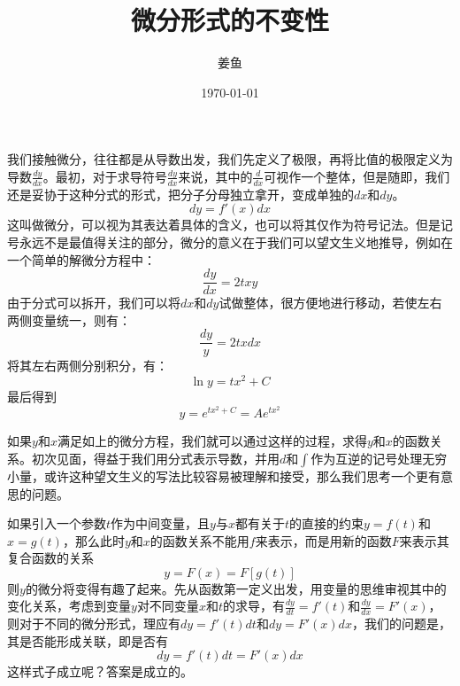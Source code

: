 \documentclass[fontset=none]{ctexart}
\begin{document}
\title{微分形式的不变性}
\author{姜鱼}
\date{\today}
\maketitle

\songti 我们接触微分，往往都是从导数出发，我们先定义了极限，再将比值的极限定义为导数$\frac{dy}{dx}$。最初，对于求导符号$\frac{dy}{dx}$来说，其中的$\frac{d}{dx}$可视作一个整体，但是随即，我们还是妥协于这种分式的形式，把分子分母独立拿开，变成单独的$dx$和$dy$。        
\begin{equation}
    dy=f'\left( x \right) dx
\end{equation}
这叫做微分，可以视为其表达着具体的含义，也可以将其仅作为符号记法。但是记号永远不是最值得关注的部分，微分的意义在于我们可以望文生义地推导，例如在一个简单的解微分方程中：
\begin{equation}
    \frac{dy}{dx}=2txy
\end{equation}
由于分式可以拆开，我们可以将$dx$和$dy$试做整体，很方便地进行移动，若使左右两侧变量统一，则有：
\begin{equation}
    \frac{dy}{y}=2txdx
\end{equation}
将其左右两侧分别积分，有：
\begin{equation}
    \ln y=tx^2+C
\end{equation}
最后得到
\begin{equation}
    y=e^{tx^2+C}=Ae^{tx^2}
\end{equation}

如果$y$和$x$满足如上的微分方程，我们就可以通过这样的过程，求得$y$和$x$的函数关系。初次见面，得益于我们用分式表示导数，并用$d$和$\int$作为互逆的记号处理无穷小量，或许这种望文生义的写法比较容易被理解和接受，那么我们思考一个更有意思的问题。

如果引入一个参数$t$作为中间变量，且$y$与$x$都有关于$t$的直接的约束$y=f(t)$和$x=g(t)$，那么此时$y$和$x$的函数关系不能用$f$来表示，而是用新的函数$F$来表示其复合函数的关系
\begin{equation}
    y=F\left( x \right) =F\left[ g\left( t \right) \right]
\end{equation}
则$y$的微分将变得有趣了起来。先从函数第一定义出发，用变量的思维审视其中的变化关系，考虑到变量$y$对不同变量$x$和$t$的求导，有$\frac{dy}{dt}=f'\left(t\right) $和$\frac{dy}{dx}=F'\left(x\right) $，则对于不同的微分形式，理应有$dy=f'(t)dt$和$dy=F'(x)dx$，我们的问题是，其是否能形成关联，即是否有
\begin{equation}
    dy=f'(t)dt=F'(x)dx
\end{equation}这样式子成立呢？答案是成立的。
\end{document}
